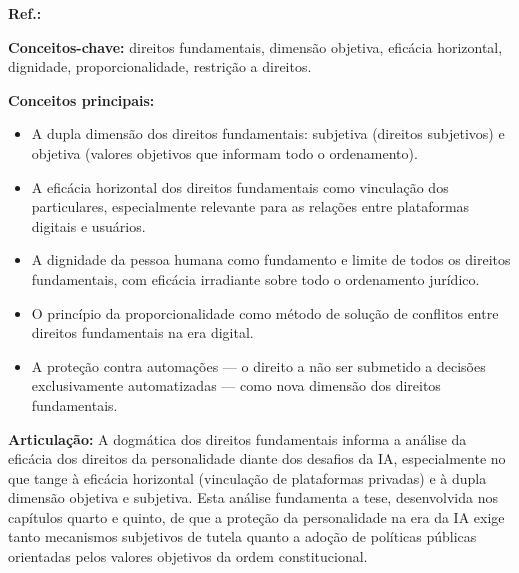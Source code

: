 \begin{fichamento}
    \textbf{Ref.:} \cite{Sarlet2021DF}
    
    \textbf{Conceitos-chave:} direitos fundamentais, dimensão objetiva, eficácia horizontal, dignidade, proporcionalidade, restrição a direitos.
    
    \textbf{Conceitos principais:}
    \begin{itemize}
        \item A dupla dimensão dos direitos fundamentais: subjetiva (direitos subjetivos) e objetiva (valores objetivos que informam todo o ordenamento).
        \item A eficácia horizontal dos direitos fundamentais como vinculação dos particulares, especialmente relevante para as relações entre plataformas digitais e usuários.
        \item A dignidade da pessoa humana como fundamento e limite de todos os direitos fundamentais, com eficácia irradiante sobre todo o ordenamento jurídico.
        \item O princípio da proporcionalidade como método de solução de conflitos entre direitos fundamentais na era digital.
        \item A proteção contra automações — o direito a não ser submetido a decisões exclusivamente automatizadas — como nova dimensão dos direitos fundamentais.
    \end{itemize}
    
    \textbf{Articulação:} A dogmática dos direitos fundamentais informa a análise da eficácia dos direitos da personalidade diante dos desafios da IA, especialmente no que tange à eficácia horizontal (vinculação de plataformas privadas) e à dupla dimensão objetiva e subjetiva. Esta análise fundamenta a tese, desenvolvida nos capítulos quarto e quinto, de que a proteção da personalidade na era da IA exige tanto mecanismos subjetivos de tutela quanto a adoção de políticas públicas orientadas pelos valores objetivos da ordem constitucional.
\end{fichamento}

